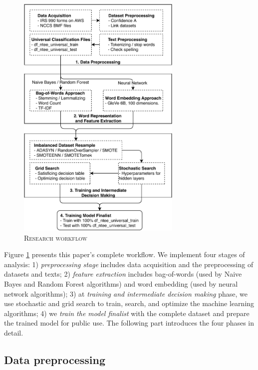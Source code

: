 \documentclass[11pt]{article}
\begin{document}
\begin{figure}
	\centering
	\caption{\textsc{Research workflow}} \label{fig:workflow}
	\includegraphics[width=0.7\textwidth]{tbl_fig/ntee_classification.pdf}
\end{figure}

Figure \ref{fig:workflow} presents this paper's complete workflow. We implement four stages of analysis: 1) \textit{preprocessing stage} includes data acquisition and the preprocessing of datasets and texts; 2) \textit{feature extraction} includes bag-of-words (used by Naive Bayes and Random Forest algorithms) and word embedding (used by neural network algorithms); 3) at \textit{training and intermediate decision making} phase, we use stochastic and grid search to train, search, and optimize the machine learning algorithms; 4) we \textit{train the model finalist} with the complete dataset and prepare the trained model for public use. The following part introduces the four phases in detail.

\subsection{Data preprocessing}
\end{document}

